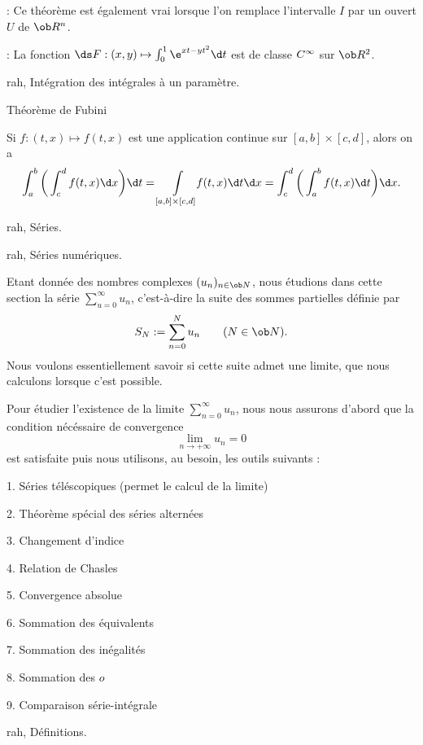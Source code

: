 \Remarque : Ce th\'eor\`eme est \'egalement vrai lorsque l'on remplace l'intervalle $I$ par un ouvert $U$ de $\ob R^n$. 
\bigskip

\Application : La fonction $\ds F:(x,y)\mapsto\int_0^1\e^{xt-yt^2}\d t$ est de classe $\sc C^\infty$ sur $\ob R^2$. 
\bigskip



\Subsection rah, Int\'egration des int\'egrales \`a un param\`etre. 
\medskip


\Concept Th\'eor\`eme de Fubini

\Theoreme [$a<b$ et $c<d$ dans $\ob R$] 
Si $f:(t,x)\mapsto f(t,x)$ est une application continue sur $[a,b]\times[c,d]$, alors on a 
$$
\int_a^b\bigg(\int_c^df(t,x)\d x\bigg)\d t=\int\limits_{[a,b]\times[c,d]}
\!\!f(t,x)\d t\d x=\int_c^d\bigg(\int_a^bf(t,x)\d t\bigg)\d x.
$$


%

\Chapter rah, S\'eries. 

\Section rah, S\'eries num\'eriques. 

Etant donn\'ee des nombres complexes $(u_n)_{n\in\ob N}$, nous \'etudions dans cette section la s\'erie $\sum_{u=0}^\infty u_n$, c'est-\`a-dire la suite des sommes partielles d\'efinie par  
$$
S_N:=\sum_{n=0}^Nu_n\qquad(N\in\ob N).
$$
Nous voulons essentiellement savoir si cette suite admet une limite, que  nous calculons lorsque c'est possible. 
\medskip

Pour \'etudier l'existence de la limite $\sum_{n=0}^\infty u_n$, nous nous assurons d'abord que  la condition n\'ec\'essaire de convergence   
$$
\lim_{n\to+\infty}u_n=0
$$
est satisfaite puis nous utilisons, au besoin, les outils suivants : 
\item{1.} S\'eries t\'el\'escopiques (permet le calcul de la limite)
\item{2.} Th\'eor\`eme sp\'ecial des s\'eries altern\'ees
\item{3.} Changement d'indice
\item{4.} Relation de Chasles
\item{5.} Convergence absolue
\item{6.} Sommation des \'equivalents
\item{7.} Sommation des in\'egalit\'es
\item{8.} Sommation des $o$
\item{9.} Comparaison s\'erie-int\'egrale

\Subsection rah, D\'efinitions. 

